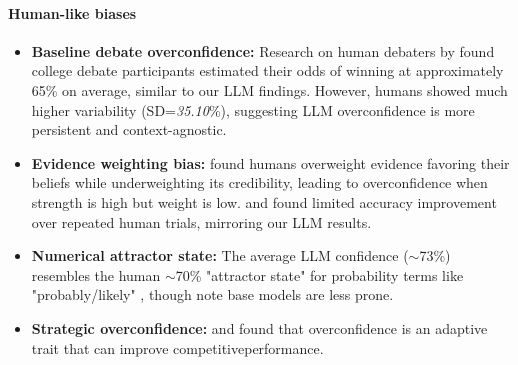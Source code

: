 \documentclass{article}
\begin{document}
\paragraph{Human-like biases}
\begin{itemize}
    \item \textbf{Baseline debate overconfidence:} Research on human debaters by \citet{RePEc:sip:dpaper:06-042} found college debate participants estimated their odds of winning at approximately 65\% on average, similar to our LLM findings. However, humans showed much higher variability (SD=\textit{35.10}\%), suggesting LLM overconfidence is more persistent and context-agnostic.

    \item \textbf{Evidence weighting bias:} \citet{GriffinTversky1992} found humans overweight evidence favoring their beliefs while underweighting its credibility, leading to overconfidence when strength is high but weight is low. \citet{Moore2008} and \citet{RePEc:sip:dpaper:06-042} found limited accuracy improvement over repeated human trials, mirroring our LLM results.

    \item \textbf{Numerical attractor state:} The average LLM confidence ($\sim$73\%) resembles the human $\sim$70\% "attractor state" for probability terms like "probably/likely" \citep{Hashim2024,Mandel2019}, though \citep{west2025basemodelsbeataligned,openai2024gpt4technicalreport} note base models are less prone.
    \item \textbf{Strategic overconfidence:} \citet{Johnson_2011} and \citet{priscilla2022overconfidence} found that overconfidence is an adaptive trait that can improve competitiveperformance.
\end{itemize}
\end{document}
